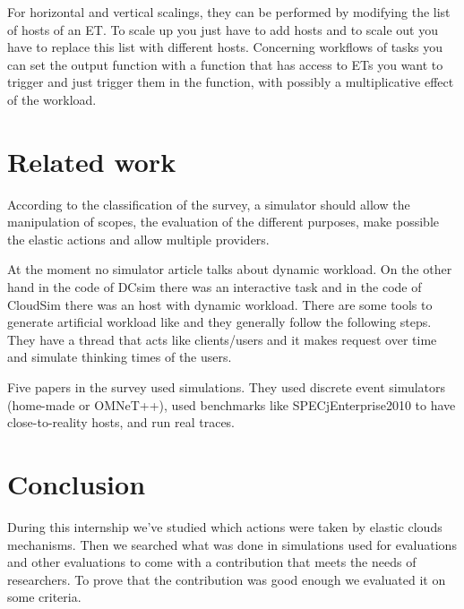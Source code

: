 \documentclass[a4paper, onecolumn, 11pt]{article}
\begin{document}
	  For horizontal and vertical scalings, they can be performed by modifying the
	  list of hosts of an ET. To scale up you just have to add hosts and to scale
	  out you have to replace this list with different hosts. Concerning workflows
	  of tasks you can set the output function with a function that has access to
	  ETs you want to trigger and just trigger them in the function, with possibly
	  a multiplicative effect of the workload.
   



\section{Related work} \label{sota}
According to the classification of the survey, a simulator should allow the
manipulation of scopes, the evaluation of the different purposes, make
possible the elastic actions and allow multiple providers.

At the moment no simulator article talks about dynamic workload. On the other
hand in the code of DCsim \cite{tighe2013towards} there was an interactive
task and in the code of CloudSim \cite{calheiros2011cloudsim} there was an
host with dynamic workload. There are some tools to generate artificial
workload like \cite{bodik2010characterizing} and they generally follow the
following steps. They have a thread that acts like clients/users and it makes
request over time and simulate thinking times of the users.


Five papers in the survey used simulations. They used discrete event 
simulators (home-made or OMNeT++), used benchmarks like SPECjEnterprise2010 
to have close-to-reality hosts, and run real traces.
  

\section{Conclusion} \label{conclu}
During this internship we've studied which actions were taken by elastic clouds 
mechanisms. Then we searched what was done in simulations used for evaluations 
and other evaluations to come with a contribution that meets the needs of 
researchers. To prove that the contribution was good enough we evaluated it on 
some criteria.
\end{document}
